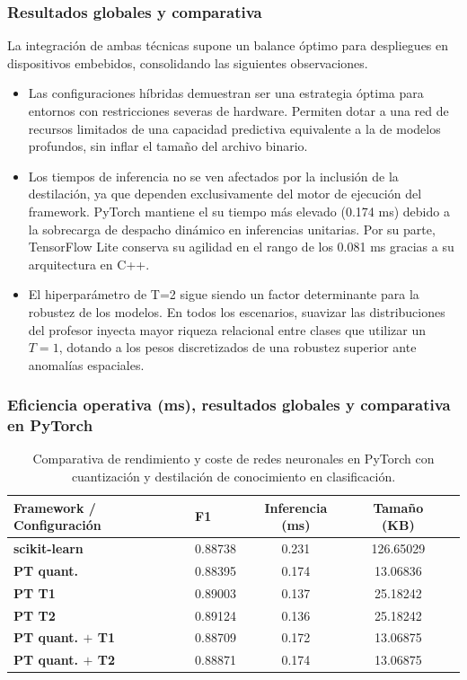 \documentclass[a4paper,12pt,twoside,final]{book}
\begin{document}
\subsubsection{Resultados globales y comparativa}
La integración de ambas técnicas supone un balance óptimo para despliegues en dispositivos embebidos, consolidando las
siguientes observaciones.
\begin{itemize}
  \item Las configuraciones híbridas demuestran ser una estrategia óptima para entornos con restricciones severas de
  hardware. Permiten dotar a una red de recursos limitados de una capacidad predictiva equivalente a la
  de modelos profundos, sin inflar el tamaño del archivo binario.
  \item Los tiempos de inferencia no se ven afectados por la inclusión de la destilación, ya que dependen exclusivamente
  del motor de ejecución del framework. PyTorch mantiene el su tiempo más elevado (0.174 ms) debido a la sobrecarga de
  despacho dinámico en inferencias unitarias. Por su parte, TensorFlow Lite conserva su agilidad en el rango de los
  0.081 ms gracias a su arquitectura en C++.
  \item El hiperparámetro de T=2 sigue siendo un factor determinante para la robustez de los modelos. En todos los
  escenarios, suavizar las distribuciones del profesor inyecta mayor riqueza relacional entre clases que utilizar un
  $T=1$, dotando a los pesos discretizados de una robustez superior ante anomalías espaciales.
\end{itemize}

\subsubsection{Eficiencia operativa (ms), resultados globales y comparativa en PyTorch}
\begin{table}[htbp]
  \centering
  \begin{tabularx}{\textwidth}{lXccc}
    \hline
    \textbf{Framework / Configuración} & \textbf{F1} & \textbf{Inferencia (ms)} & \textbf{Tamaño (KB)} \\
    \hline
    \textbf{scikit-learn}     & 0.88738 & 0.231 & 126.65029 \\
    \hline
    \textbf{PT quant.}        & 0.88395 & 0.174 & 13.06836 \\
    \textbf{PT T1}            & 0.89003 & 0.137 & 25.18242 \\
    \textbf{PT T2}            & 0.89124 & 0.136 & 25.18242 \\
    \textbf{PT quant. $+$ T1} & 0.88709 & 0.172 & 13.06875 \\
    \textbf{PT quant. $+$ T2} & 0.88871 & 0.174 & 13.06875 \\
    \hline
  \end{tabularx}
  \caption{Comparativa de rendimiento y coste de redes neuronales en PyTorch con cuantización y destilación de conocimiento en clasificación.}
  \label{tab:pytorch_quant_kd_clas_resumen}
\end{table}
\end{document}
